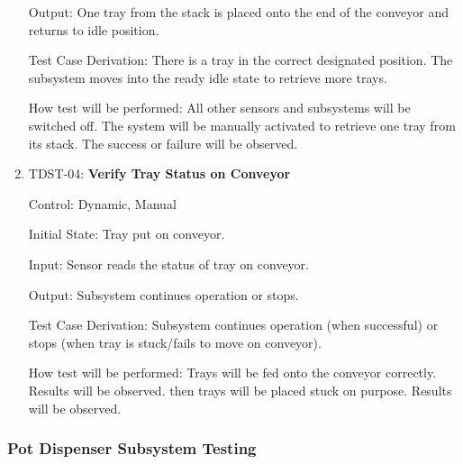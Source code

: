 \documentclass[12pt, titlepage]{article}
\begin{document}
\begin{enumerate}
  Output: One tray from the stack is placed onto the end of the conveyor and returns to idle position.
  
  Test Case Derivation: There is a tray in the correct designated position.
  The subsystem moves into the ready idle state to retrieve more trays.
            
  How test will be performed: All other sensors and subsystems will be switched off. 
  The system will be manually activated to retrieve one tray from its stack.
  The success or failure will be observed.
\\
  \item{TDST-04: \textbf{Verify Tray Status on Conveyor}}
  
  Control: Dynamic, Manual
            
  Initial State: Tray put on conveyor.
            
  Input: Sensor reads the status of tray on conveyor.
            
  Output: Subsystem continues operation or stops.
  
  Test Case Derivation: Subsystem continues operation (when successful) or stops (when tray is stuck/fails to move on conveyor).
  
  How test will be performed: Trays will be fed onto the conveyor correctly. Results will be observed.
  then trays will be placed stuck on purpose. Results will be observed.
  
  \end{enumerate}

\subsubsection{Pot Dispenser Subsystem Testing}
\end{document}
